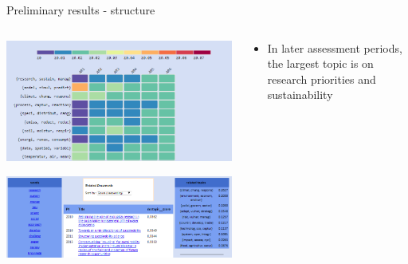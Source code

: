 \documentclass[9pt]{beamer}
\begin{document}
\begin{frame}{Preliminary results - structure}

\begin{columns}
	\begin{column}{0.6\linewidth}
		\begin{center}
			\includegraphics[width=0.85\linewidth]{../plots/shares_10_372.PNG}
			
			\medskip
			
			\includegraphics[width=0.85\linewidth]{../plots/sustainability.PNG}
		\end{center}
	\end{column}
	\begin{column}{0.4\linewidth}
		\begin{center}
			\begin{itemize}
				\item In later assessment periods, the largest topic is on research priorities and sustainability
			\end{itemize}
		\end{center}
	\end{column}
\end{columns}

\end{frame}
\end{document}
